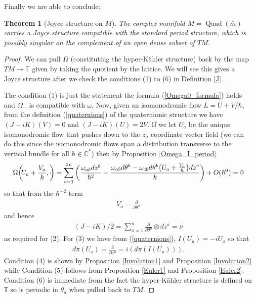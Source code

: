 \documentclass[a4paper,12pt,reqno]{amsart}
\newcounter{counter2}
\numberwithin{equation}{section}
\numberwithin{counter2}{section}
\newcounter{counter3}
\newtheorem{thm}[counter2]{Theorem}
\begin{document}
Finally we are able to conclude:
\begin{thm}[Joyce structure on $M$]
The complex manifold $M = \operatorname{Quad}(\bar{m})$ carries a Joyce structure compatible with the standard period structure,  which is possibly singular on the complement of an open dense subset of $TM$.  
\end{thm}
\begin{proof}
We can pull $\Omega$ (constituting the hyper-K\"ahler structure) back by the map $TM \to \mathbb{T}$ given by taking the quotient by the lattice.  We will see this gives a Joyce structure after we check the conditions (1) to (6) in Definition \ref{J}.  \par 
The condition (1) is just the statement the formula (\ref{Omega0_formula}) holds and $\Omega_{-}$ is compatible with $\omega$.  Now,  given an isomonodromic flow $L = U + V/\hbar$,  from the definition (\ref{quaternions}) of the quaternionic structure we have $(J-iK)(V) = 0$ and $(J-iK)(U) = 2V$.  If we let $U_a$ be the unique isomonodromic flow that pushes down to the $z_{a}$ coordinate vector field (we can do this since the isomonodromic flows span a distribution transverse to the vertical bundle for all $\hbar \in \mathbb{C}^*$) then by Proposition \ref{Omega_I_period} 
\begin{align}
\Omega\bigg(\hspace{-1mm}U_a+\frac{V_a}{\hbar},\cdot\hspace{-1mm}\bigg) = \sum_{b=1}^{2n} \bigg(  \frac{\omega_{ab}dz^{b}}{\hbar^2} - \frac{\omega_{ab}d\theta^{b} - \omega_{cb}d\theta^{b}\big(U_a+\frac{V_a}{\hbar}\big)dz^{c}}{\hbar} \bigg) + O(\hbar^0) = 0
\end{align}
so that from the $\hbar^{-2}$ term
\begin{align}
V_a = \frac{\partial}{\partial \theta^{a}}
\end{align}
and hence
\begin{align}
(J-iK)/2 = \sum_{a=1}^{n}  \frac{\partial}{\partial \theta^{a}} \otimes dz^a = \nu
\end{align}
as required for (2).  For (3) we have from (\ref{quaternions}),  $I(U_a) = -iU_a$ so that
\begin{align}
d\pi(U_a) = \frac{\partial}{\partial z^{a}} = i(d\pi(I(U_a))).
\end{align} 
Condition (4) is shown by Proposition \ref{Involution1} and Proposition \ref{Involution2} while Condition (5) follows from Proposition \ref{Euler1} and Proposition \ref{Euler2}.  
Condition (6) is immediate from the fact the hyper-K\"ahler structure is defined on $\mathbb{T}$ so is periodic in $\theta_{a}$ when pulled back to $TM$.  
\end{proof}
\end{document}
